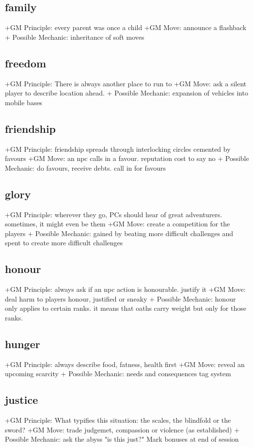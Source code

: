 \documentclass{tufte-handout}
\begin{document}
\subsection{family}
+GM Principle: every parent was once a child
+GM Move: 	announce a flashback
+ Possible Mechanic: 	inheritance of soft moves

\subsection{freedom}
+GM Principle:  There is always another place to run to
+GM Move:  ask a silent player to describe location ahead.
+ Possible Mechanic: expansion of vehicles into mobile bases 

\subsection{friendship}
+GM Principle: friendship spreads through interlocking circles cemented by favours
+GM Move: an npc calls in a favour. reputation cost to say no 
+ Possible Mechanic: do favours, receive debts. call in for favours
		
\subsection{glory}
+GM Principle: wherever they go, PCs should hear of great adventurers. sometimes, it might even be them
+GM Move: create a competition for the players
+ Possible Mechanic: gained by beating more difficult challenges and spent to create more difficult challenges  

\subsection{honour}
+GM Principle: always ask if an npc action is honourable. justify it
+GM Move: deal harm to players honour, justified or sneaky
+ Possible Mechanic: honour only applies to certain ranks. it means that oaths carry weight but only for those ranks.

\subsection{hunger}
+GM Principle:  always describe food, fatness, health first
+GM Move:   reveal an upcoming scarcity
+ Possible Mechanic: needs and consequences tag system

\subsection{justice}
+GM Principle: What typifies this situation: the scales, the blindfold or the sword?	
+GM Move: trade judgemet, compassion or violence (as established)
+ Possible Mechanic: ask the abyss "is this just?" Mark bonuses at end of session 
\end{document}
